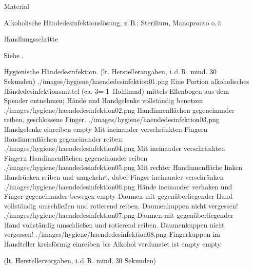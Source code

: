 \Text
{Material}
{\begin{compactitem}
    \item Alkoholische Händedesinfektionslösung, z.\,B.:
    Sterilium\texttrademark{}, Manopronto\texttrademark{}
    o.\,ä.
\end{compactitem}}
{}
{}
{}
{}





\TextSlide
{Handlungsschritte}
{Siehe .


\begin{PictureSeriesWide}{}{Hygienische Händedesinfektion.  (lt.
Herstellerangaben, i.\,d.\,R. mind. 30 Sekunden)
\label{fig:haendedesinfektion}}
{./images/hygiene/haendedesinfektion01.png}
{Eine Portion alkoholisches
    Händedesinfektionsmittel (ca. 3\Ml* = 1~Hohlhand)
    mittels Ellenbogen aus dem Spen\-der entnehmen; Hände
    und Handgelenke vollständig benetzen}
{./images/hygiene/haendedesinfektion02.png}
{Handinnenflächen gegeneinander reiben, geschlossene Finger.}
{./images/hygiene/haendedesinfektion03.png}
{Handgelenke einreiben}
{empty}
{Mit ineinander verschränkten Fingern Handinnenflächen
    gegeneinander reiben}
%
{./images/hygiene/haendedesinfektion04.png}
{Mit ineinander verschränkten Fingern Handinnenflächen
    gegeneinander reiben}
{./images/hygiene/haendedesinfektion05.png}
{Mit rechter Handinnenfläche linken Handrücken reiben und
    umgekehrt, dabei Finger ineinander verschränken}
{./images/hygiene/haendedesinfektion06.png}
{Hände ineinander verhaken und Finger gegeneinander bewegen}
{empty}
{Daumen mit gegenüberliegender Hand vollständig umschließen
    und rotierend reiben. Daumenkuppen nicht vergessen!} 
%
{./images/hygiene/haendedesinfektion07.png}
{Daumen mit gegenüberliegender Hand vollständig umschließen
    und rotierend reiben. Daumenkuppen nicht vergessen!}
{./images/hygiene/haendedesinfektion08.png}
{Fingerkuppen im Handteller kreisförmig einreiben bis Alkohol
    verdunstet ist}
{empty}
{}
{empty}
{}
\end{PictureSeriesWide}}
{}
{}
{}
{}




 (lt.
Herstellervorgaben, i.\,d.\,R. mind. 30 Sekunden)


